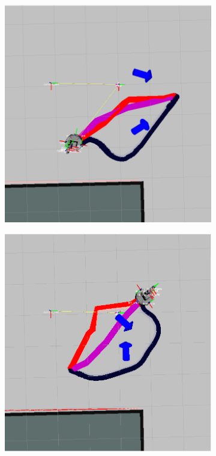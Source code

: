 \documentclass{article}  %
\begin{document}
\begin{figure}[tbh]
\begin{subfigure}[b]{0.42\columnwidth}
    \caption{}
    \label{fig:res_real2}
  \end{subfigure} 
  \\
        \begin{subfigure}[b]{0.42\columnwidth}
    \includegraphics[scale=0.15]{images/real_reasonable2.png}
    \caption{}
    \label{fig:res_real3}
  \end{subfigure}
  \hspace{10mm}
  \begin{subfigure}[b]{0.42\columnwidth}
  \hspace{4mm}
    \includegraphics[scale=0.15]{images/real_reasonable3.png}

\end{subfigure}
\end{figure}
\end{document}
